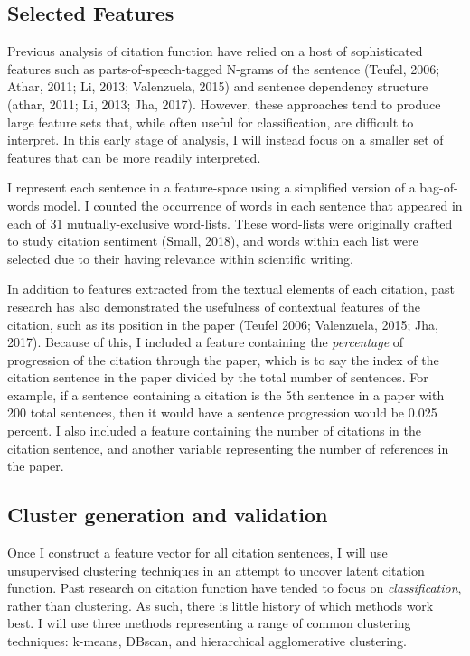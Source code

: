 \documentclass[
10pt, %
a4paper, %
oneside, %
headinclude,footinclude, %
BCOR5mm, %
]{scrartcl}
\begin{document}
\subsection{Selected Features}

Previous analysis of citation function have relied on a host of sophisticated features such as parts-of-speech-tagged N-grams of the sentence (Teufel, 2006; Athar, 2011; Li, 2013; Valenzuela, 2015) and sentence dependency structure (athar, 2011; Li, 2013; Jha, 2017). However, these approaches tend to produce large feature sets that, while often useful for classification, are difficult to interpret. In this early stage of analysis, I will instead focus on a smaller set of features that can be more readily interpreted.  

I represent each sentence in a feature-space using a simplified version of a bag-of-words model. I counted the occurrence of words in each sentence that appeared in each of 31 mutually-exclusive word-lists. These word-lists were originally crafted to study citation sentiment (Small, 2018), and words within each list were selected due to their having relevance within scientific writing. 

In addition to features extracted from the textual elements of each citation, past research has also demonstrated the usefulness of contextual features of the citation, such as its position in the paper (Teufel 2006; Valenzuela, 2015; Jha, 2017). Because of this, I included a feature containing the \textit{percentage} of progression of the citation through the paper, which is to say the index of the citation sentence in the paper divided by the total number of sentences. For example, if a sentence containing a citation is the 5th sentence in a paper with 200 total sentences, then it would have a sentence progression would be 0.025 percent. I also included a feature containing the number of citations in the citation sentence, and another variable representing the number of references in the paper. 

\subsection{Cluster generation and validation}
Once I construct a feature vector for all citation sentences, I will use unsupervised clustering techniques in an attempt to uncover latent citation function. Past research on citation function have tended to focus on \textit{classification}, rather than clustering. As such, there is little history of which methods work best. I will use three methods representing a range of common clustering techniques: k-means, DBscan, and hierarchical agglomerative clustering. 
\end{document}
